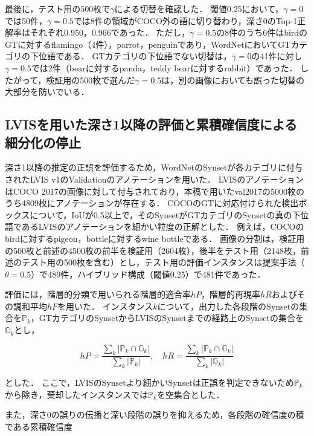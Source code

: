 最後に，テスト用の500枚で$ \gamma $による切替を確認した．
閾値0.25において，$ \gamma = 0 $では50件，$ \gamma = 0.5 $では8件の領域がCOCO外の語に切り替わり，深さ0のTop-1正解率はそれぞれ0.950，0.966であった．
ただし，$ \gamma = 0.5 $の8件のうち6件はbirdのGTに対するflamingo（4件），parrot，penguinであり，WordNetにおいてGTカテゴリの下位語である．
GTカテゴリの下位語でない切替は，$ \gamma = 0 $の41件に対し$ \gamma = 0.5 $では2件（bearに対するpanda，teddy bearに対するrabbit）であった．
したがって，検証用の500枚で選んだ$ \gamma = 0.5 $は，別の画像においても誤った切替の大部分を防いでいる．

\subsection{LVISを用いた深さ1以降の評価と累積確信度による細分化の停止}
深さ1以降の推定の正誤を評価するため，WordNetのSynsetが各カテゴリに付与されたLVIS v1\cite{ref_LVIS}のValidationのアノテーションを用いた．
LVISのアノテーションはCOCO 2017の画像に対して付与されており，本稿で用いたval2017の5000枚のうち4809枚にアノテーションが存在する．
COCOのGTに対応付けられた検出ボックスについて，IoUが0.5以上で，そのSynsetがGTカテゴリのSynsetの真の下位語であるLVISのアノテーションを細かい粒度の正解とした．
例えば，COCOのbirdに対するpigeon，bottleに対するwine bottleである．
画像の分割は，検証用の500枚と前述の4500枚の前半を検証用（2604枚），後半をテスト用（2148枚，前述のテスト用の500枚を含む）とし，テスト用の評価インスタンスは提案手法（$ \theta = 0.5 $）で489件，ハイブリッド構成（閾値0.25）で481件であった．

評価には，階層的分類で用いられる階層的適合率$ hP $，階層的再現率$ hR $およびその調和平均$ hF $\cite{ref_hF}を用いた．
インスタンス$ k $について，出力した各段階のSynsetの集合を$ {\mathbb P}_k $，GTカテゴリのSynsetからLVISのSynsetまでの経路上のSynsetの集合を$ {\mathbb G}_k $とし，

\begin{equation}
    hP = \frac{\sum_k |{\mathbb P}_k \cap {\mathbb G}_k|}{\sum_k |{\mathbb P}_k|}, \quad
    hR = \frac{\sum_k |{\mathbb P}_k \cap {\mathbb G}_k|}{\sum_k |{\mathbb G}_k|}
    \label{eq_hierarchical_pr}
\end{equation}

\noindent
とした．
ここで，LVISのSynsetより細かいSynsetは正誤を判定できないため$ {\mathbb P}_k $から除き，棄却したインスタンスでは$ {\mathbb P}_k $を空集合とした．

また，深さ0の誤りの伝播と深い段階の誤りを抑えるため，各段階の確信度の積である累積確信度

